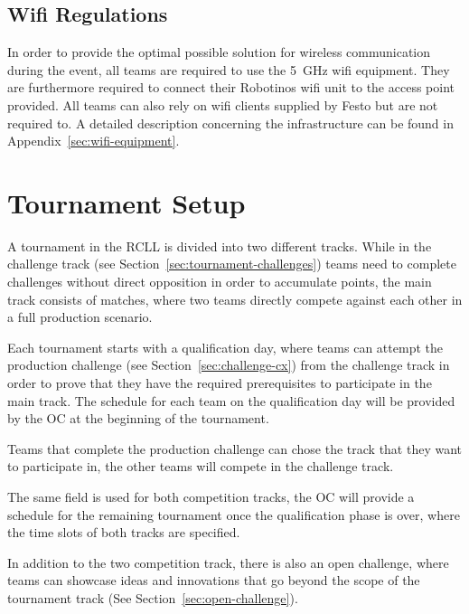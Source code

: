 \documentclass[12pt,twoside]{article}
\newcommand{\refsec}[1]{Section~\ref{#1}}
\begin{document}
\subsection{Wifi Regulations}
\label{sec:wifi-regulations}
In order to provide the optimal possible solution for wireless
communication during the event, all teams are required to use the
\SI{5}{\giga\hertz} wifi equipment. They are furthermore required to
connect their Robotinos wifi unit to the access point provided. All
teams can also rely on wifi clients supplied by Festo but are not
required to. A detailed description concerning the infrastructure can
be found in Appendix~\ref{sec:wifi-equipment}.




\section{Tournament Setup}
A tournament in the \ac{RCLL} is divided into two different tracks.
While in the challenge track (see \refsec{sec:tournament-challenges}) teams
need to complete challenges without direct opposition in order to accumulate
points, the main track consists of matches, where two teams directly compete
against each other in a full production scenario.

Each tournament starts with a qualification day, where teams can attempt
the production challenge (see \refsec{sec:challenge-cx}) from the challenge
track in order to prove that they have the required prerequisites to participate
in the main track. The schedule for each team on the qualification day will be
provided by the \ac{OC} at the beginning of the tournament.

Teams that complete the production challenge can chose the track that they
want to participate in, the other teams will compete in the challenge track.

The same field is used for both competition tracks, the \ac{OC} will provide
a schedule for the remaining tournament once the qualification phase is over,
where the time slots of both tracks are specified.

In addition to the two competition track, there is also an open challenge, where
teams can showcase ideas and innovations that go beyond the scope of the
tournament track (See \refsec{sec:open-challenge}).
\end{document}
